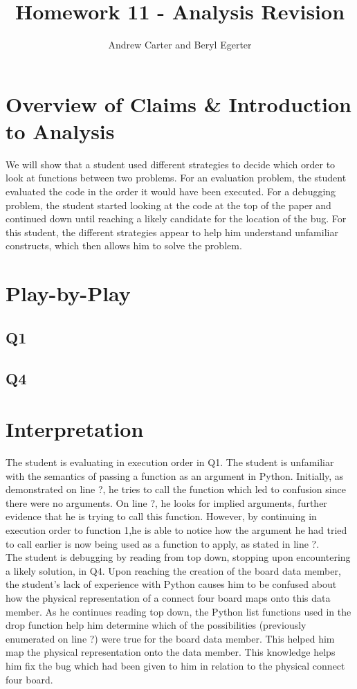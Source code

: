 \documentclass{article}
\title{Homework 11 - Analysis Revision}
\author{Andrew Carter and Beryl Egerter}
\begin{document}
\maketitle
\section{Overview of Claims \& Introduction to Analysis}

We will show that a student used different strategies to decide which order to look at functions between two problems.
For an evaluation problem, the student evaluated the code in the order it would have been executed.
For a debugging problem, the student started looking at the code at the top of the paper and continued down until reaching a likely candidate for the location of the bug.
For this student, the different strategies appear to help him understand unfamiliar constructs, which then allows him to solve the problem.

\section{Play-by-Play}
\subsection{Q1}
\subsection{Q4}

\section{Interpretation}

The student is evaluating in execution order in Q1.
The student is unfamiliar with the semantics of passing a function as an argument in Python.
Initially, as demonstrated on line ?, he tries to call the function which led to confusion since there were no arguments. On line ?, he looks for implied arguments, further evidence that he is trying to call this function.
However, by continuing in execution order to function 1,he is able to notice how the argument he had tried to call earlier is now being used as a function to apply, as stated in line ?.  \\

The student is debugging by reading from top down, stopping upon encountering a likely solution, in Q4.
Upon reaching the creation of the board data member, the student's lack of experience with Python causes him to be confused about how the physical representation of a connect four board maps onto this data member.
As he continues reading top down, the Python list functions used in the drop function help him determine which of the possibilities (previously enumerated on line ?) were true for the board data member.
This helped him map the physical representation onto the data member.
This knowledge helps him fix the bug which had been given to him in relation to the physical connect four board.  \\
\end{document}
